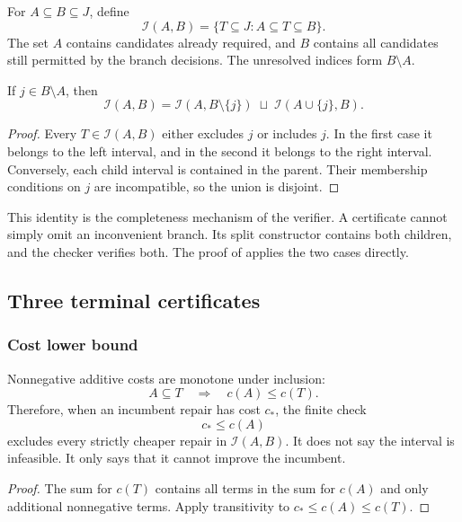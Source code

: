 \begin{CRdefinition}
For $A\subseteq B\subseteq J$, define
\[
 \mathcal I(A,B)=\{T\subseteq J:A\subseteq T\subseteq B\}.
\]
The set $A$ contains candidates already required, and $B$ contains all candidates still permitted by the branch decisions. The unresolved indices form $B\setminus A$.
\end{CRdefinition}

\begin{CRlemma}
If $j\in B\setminus A$, then
\[
 \mathcal I(A,B)=
 \mathcal I(A,B\setminus\{j\})\;\sqcup\;
 \mathcal I(A\cup\{j\},B).
\]
\end{CRlemma}
\begin{proof}
Every $T\in\mathcal I(A,B)$ either excludes $j$ or includes $j$. In the first case it belongs to the left interval, and in the second it belongs to the right interval. Conversely, each child interval is contained in the parent. Their membership conditions on $j$ are incompatible, so the union is disjoint.
\end{proof}

This identity is the completeness mechanism of the verifier. A certificate cannot simply omit an inconvenient branch. Its split constructor contains both children, and the checker verifies both. The proof of  applies the two cases directly.

\subsection{Three terminal certificates}

\subsubsection{Cost lower bound}

Nonnegative additive costs are monotone under inclusion:
\[
 A\subseteq T\quad\Longrightarrow\quad c(A)\leq c(T).
\]
Therefore, when an incumbent repair has cost $c_\ast$, the finite check
\[
 c_\ast\leq c(A)
\]
excludes every strictly cheaper repair in $\mathcal I(A,B)$. It does not say the interval is infeasible. It only says that it cannot improve the incumbent.

\begin{proof}
The sum for $c(T)$ contains all terms in the sum for $c(A)$ and only additional nonnegative terms. Apply transitivity to $c_\ast\leq c(A)\leq c(T)$.
\end{proof}

